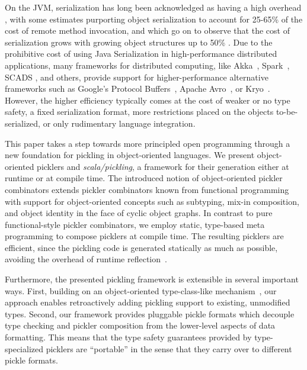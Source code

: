 \documentclass[10pt]{sigplanconf}
\theoremstyle{definition}
\theoremstyle{definition}
\begin{document}
On the JVM, serialization has long been
acknowledged as having a high overhead \cite{Welsh2000, Carpenter1999}, with
some estimates purporting object serialization to account for 25-65\% of the
cost of remote method invocation, and which go on to observe that the cost of
serialization grows with growing object structures up to 50\%
\cite{Philippsen2000, Maassen1999}.
Due to the prohibitive cost of using Java Serialization in high-performance
distributed applications, many frameworks for distributed computing, like
Akka~\cite{Akka}, Spark~\cite{Zaharia2012}, SCADS \cite{Armbrust2009}, and
others, provide support for higher-performance alternative frameworks such as
Google's Protocol Buffers~\cite{Protobuf}, Apache Avro~\cite{Avro}, or
Kryo~\cite{Kryo}. However, the higher efficiency typically comes at the cost
of weaker or no type safety, a fixed serialization format, more restrictions
placed on the objects to-be-serialized, or only rudimentary language
integration.

This paper takes a step towards more principled open programming through a new
foundation for pickling in object-oriented languages. We present object-oriented
picklers and \textit{scala/pickling}, a framework for their generation either at runtime or at
compile time. The introduced notion of object-oriented pickler combinators
extends pickler combinators known from functional
programming~\cite{Kennedy2004} with support for object-oriented concepts such
as subtyping, mix-in composition,  and object identity in the face of cyclic
object graphs. In contrast to pure functional-style
pickler combinators, we employ static, type-based meta programming to compose
picklers at compile time. The resulting picklers are efficient, since the
pickling code is generated statically as much as possible, avoiding the
overhead of runtime reflection~\cite{Gil2008,Dubochet2011}.

Furthermore, the presented pickling framework is extensible in several
important ways. First, building on an object-oriented type-class-like
mechanism~\cite{Oliveira2010}, our approach enables retroactively adding
pickling support to existing, unmodified types. Second, our framework provides
pluggable pickle formats which decouple type checking and pickler composition
from the lower-level aspects of data formatting. This means that the type
safety guarantees provided by type-specialized picklers are ``portable'' in
the sense that they carry over to different pickle formats.
\end{document}
